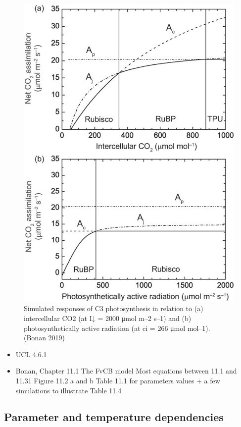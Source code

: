 \documentclass[12pt,oneside]{book}
\providecommand{\tightlist}{%
  \setlength{\itemsep}{0pt}\setlength{\parskip}{0pt}}
\begin{document}
\begin{figure}

{\centering \includegraphics[width=0.8\linewidth]{figures/chap2/simulated_responses} 

}

\caption{Simulated responses of C3 photosynthesis in relation to (a) intercellular CO2 (at I↓ = 2000 μmol m–2 s–1) and (b) photosynthetically active radiation (at ci = 266 μmol mol–1). (Bonan 2019)}\label{fig:f28}
\end{figure}

\begin{itemize}
\tightlist
\item
  UCL 4.6.1
\item
  Bonan, Chapter 11.1 The FvCB model Most equations between 11.1 and
  11.31 Figure 11.2 a and b Table 11.1 for parameters values + a few
  simulations to illustrate Table 11.4
\end{itemize}

\subsection{Parameter and temperature
dependencies}\label{parameter-and-temperature-dependencies}
\end{document}
